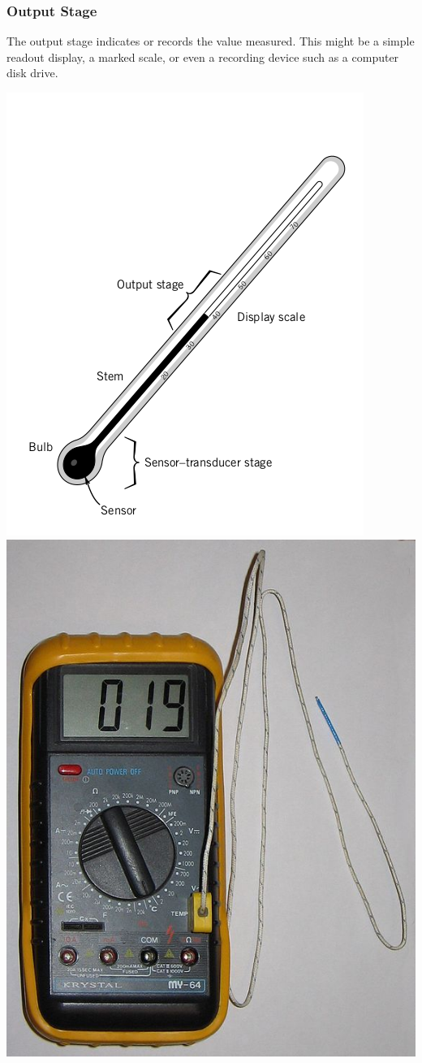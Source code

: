 \documentclass[fleqn]{beamer} %
\begin{document}
			\begin{frame}
				\frametitle{Output Stage}
				The {\BR output stage} indicates or records the value measured. This might be a simple readout
				display, a marked scale, or even a recording device such as a computer disk drive.

				\includegraphics[scale=0.25]{images/bulb_thermometer.png} \hspace{10mm}\includegraphics[scale=0.3]{images/thermocouple.jpg}


\end{frame}
\end{document}

